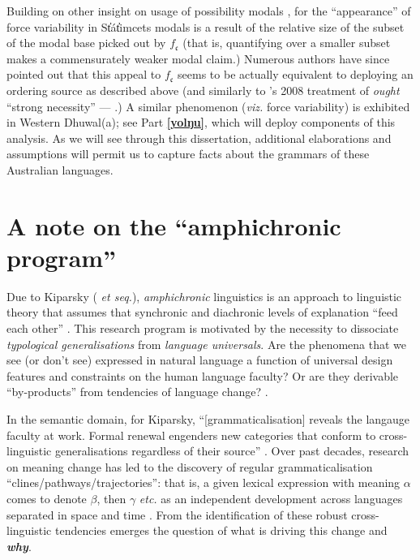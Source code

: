 \documentclass[12pt,dvipsnames]{report}
\begin{document}
Building on other insight on usage of possibility modals \citep[notably][]{Klinedinst2007}, for \citet{Rullmann2008} the ``appearance'' of force variability in St̓át̓imcets modals is a result of the relative size of the subset of the modal base picked out by $ f_{\mathfrak c} $ (that is, quantifying over a smaller subset makes a commensurately weaker modal claim.) Numerous authors have since pointed out that this appeal to $ f_{\mathfrak c} $ seems to be actually equivalent to deploying an ordering source as described above (and similarly to \citeauthor{VonFintel2008}'s 2008 treatment of \textit{ought} ``strong necessity'' --- \citealp[see][]{Portner2009,Matthewson2010,Peterson2008}.)
 A similar phenomenon (\textit{viz.} force variability) is exhibited in Western Dhuwal(a); see Part \textbf{\ref{yolŋu}}, which will deploy components of this analysis. As we will see through this dissertation, additional elaborations and assumptions will permit us to capture facts about the grammars of these Australian languages.

\section{A note on the ``amphichronic program''}\label{amph}

Due to Kiparsky (\citeyear{Kiparsky2006} \textit{et seq.}), \textit{amphichronic} linguistics is an approach to linguistic theory that assumes that synchronic and diachronic levels of explanation ``feed each other'' \citep[see also][]{Bermudez-Otero2013}. This research program is motivated by the necessity to dissociate \textit{typological generalisations} from \textit{language universals}. Are the phenomena that we see (or don't see) expressed in natural language a function of universal design features and constraints on the human language faculty? Or are they derivable ``by-products'' from tendencies of language change? \citep[see also][]{Anderson2008,Anderson2016a}.%

In the semantic domain, for Kiparsky, ``[grammaticalisation] reveals the langauge faculty at work. Formal renewal engenders new categories that conform to cross-linguistic generalisations regardless of their source'' \citep[73]{Kiparsky2015}. Over past decades, research on meaning change has led to the discovery of regular grammaticalisation ``clines/pathways/trajectories'': that is, a given lexical expression with meaning $ \alpha $ comes to denote $ \beta $, then $ \gamma $ \textit{etc.} as an independent development across languages separated in space and time \citep[see][]{Deo2015,Eckardt2011}. From the identification of these robust cross-linguistic tendencies emerges the question of what is driving this change and \textbf{\textit{why}}.
\end{document}
